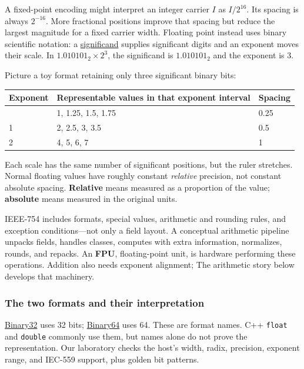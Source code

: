 A fixed-point encoding might interpret an integer carrier \(I\) as \(I/2^{16}\). Its spacing is always \(2^{-16}\). More fractional positions improve that spacing but reduce the largest magnitude for a fixed carrier width. Floating point instead uses binary scientific notation: a \hyperref[appendix-a24fd710cf67]{significand} supplies significant digits and an exponent moves their scale. In \(1.010101_2\times2^3\), the significand is \(1.010101_2\) and the exponent is 3.

Picture a toy format retaining only three significant binary bits:

{\def\LTcaptype{none} %
\begin{longtable}[]{@{}lll@{}}
\toprule\noalign{}
Exponent & Representable values in that exponent interval & Spacing \\
\midrule\noalign{}
\endhead
\bottomrule\noalign{}
\endlastfoot
0 & 1, 1.25, 1.5, 1.75 & 0.25 \\
1 & 2, 2.5, 3, 3.5 & 0.5 \\
2 & 4, 5, 6, 7 & 1 \\
\end{longtable}
}

Each scale has the same number of significant positions, but the ruler stretches. Normal floating values have roughly constant \emph{relative} precision, not constant absolute spacing. \textbf{Relative} means measured as a proportion of the value; \textbf{absolute} means measured in the original units.

IEEE-754 includes formats, special values, arithmetic and rounding rules, and exception conditions---not only a field layout. A conceptual arithmetic pipeline unpacks fields, handles classes, computes with extra information, normalizes, rounds, and repacks. An \textbf{FPU}, floating-point unit, is hardware performing these operations. Addition also needs exponent alignment; The arithmetic story below develops that machinery.

\subsubsection{The two formats and their interpretation}\label{05-engine-i-ch001-the-two-formats-and-their-interpretation}

\hyperref[appendix-5057f9ad327f]{Binary32} uses 32 bits; \hyperref[appendix-5078dfab64e6]{Binary64} uses 64. These are format names. C++ \texttt{float} and \texttt{double} commonly use them, but names alone do not prove the representation. Our laboratory checks the host's width, radix, precision, exponent range, and IEC-559 support, plus golden bit patterns.

